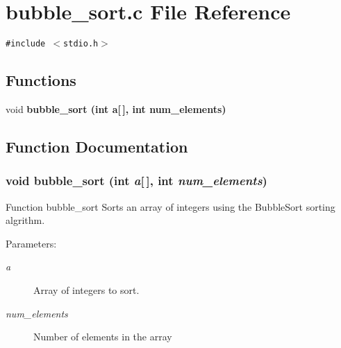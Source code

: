 \section{bubble\_\-sort.c File Reference}
\label{bubble__sort_8c}
{\tt \#include $<$stdio.h$>$}\par
\subsection*{Functions}
\begin{CompactItemize}
\item 
void \bf{bubble\_\-sort} (int a[$\,$], int num\_\-elements)
\end{CompactItemize}


\subsection{Function Documentation}
\subsubsection{\setlength{\rightskip}{0pt plus 5cm}void bubble\_\-sort (int {\em a}[$\,$], int {\em num\_\-elements})}\label{bubble__sort_8c_8a1a6deeb7038b908107983dcfb437f5}


Function bubble\_\-sort Sorts an array of integers using the Bubble\-Sort sorting algrithm. \begin{Desc}
\item[Parameters:]
\begin{description}
\item[{\em a}]Array of integers to sort. \item[{\em num\_\-elements}]Number of elements in the array \end{description}
\end{Desc}
